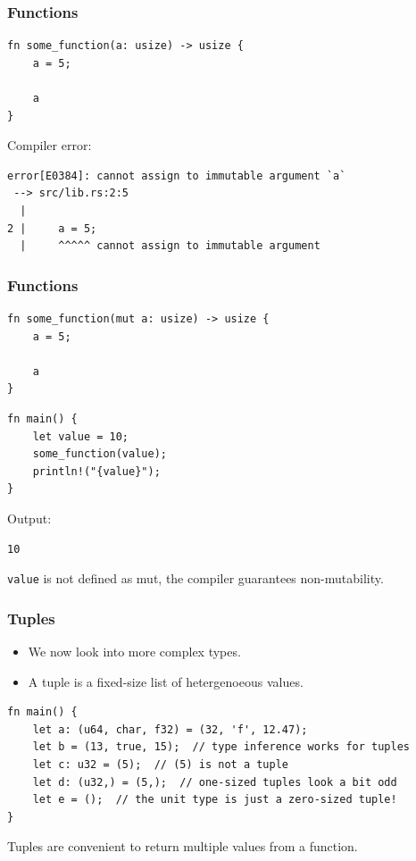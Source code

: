 \documentclass[aspectratio=169]{beamer}
\begin{document}
\begin{frame}[fragile]
    \frametitle{Functions}
    \begin{verbatim}
fn some_function(a: usize) -> usize {
    a = 5;

    a
}
    \end{verbatim}
    \pause
    Compiler error:
    \begin{verbatim}
error[E0384]: cannot assign to immutable argument `a`
 --> src/lib.rs:2:5
  |
2 |     a = 5;
  |     ^^^^^ cannot assign to immutable argument
    \end{verbatim}
\end{frame}

\begin{frame}[fragile]
    \frametitle{Functions}
    \begin{verbatim}
fn some_function(mut a: usize) -> usize {
    a = 5;

    a
}
    \end{verbatim}
    \pause
    \begin{verbatim}
fn main() {
    let value = 10;
    some_function(value);
    println!("{value}");
}
    \end{verbatim}
    Output:
    \pause
    \begin{verbatim}
10
    \end{verbatim}
    \pause
    \texttt{value} is not defined as mut, the compiler guarantees non-mutability.
\end{frame}

\begin{frame}[fragile]
    \frametitle{Tuples}
    \begin{itemize}
        \item We now look into more complex types.
        \item A tuple is a fixed-size list of hetergenoeous values.
    \end{itemize}
    \pause
    \begin{verbatim}
fn main() {
    let a: (u64, char, f32) = (32, 'f', 12.47);
    let b = (13, true, 15);  // type inference works for tuples
    let c: u32 = (5);  // (5) is not a tuple
    let d: (u32,) = (5,);  // one-sized tuples look a bit odd
    let e = ();  // the unit type is just a zero-sized tuple!
}
    \end{verbatim}
    \pause
    Tuples are convenient to return multiple values from a function.
\end{frame}
\end{document}
